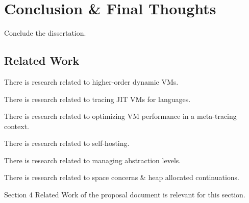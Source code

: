 \chapter{Conclusion \& Final Thoughts}

    \begin{chaptersynopsis}
        Conclude the dissertation.
    \end{chaptersynopsis}

    \section{Related Work}
        \label{section:related-work}

        \begin{mainpoint}
            There is research related to higher-order dynamic VMs.

            There is research related to tracing JIT VMs for languages.

            There is research related to optimizing VM performance in a meta-tracing context.

            There is research related to self-hosting.

            There is research related to managing abstraction levels.

            There is research related to space concerns \& heap allocated continuations.

        \end{mainpoint}

        \begin{todo}[Import]
            Section 4 Related Work of the proposal document is relevant for this section.
        \end{todo}

